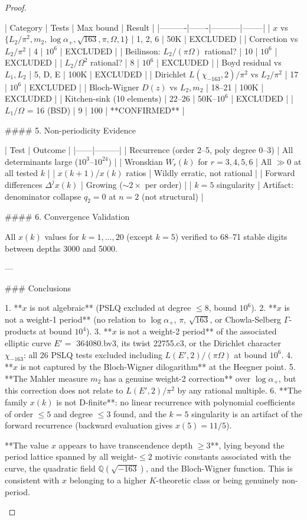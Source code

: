\begin{theorem}
\begin{lemma}
\begin{proposition}
\begin{corollary}
\begin{proof}
\begin{remark}
| Category | Tests | Max bound | Result |
|----------|-------|-----------|--------|
| $x$ vs $\{L_2/\pi^2, m_2, \log\alpha_+, \sqrt{163}, \pi, \Omega, 1\}$ | 1, 2, 6 | 50K | EXCLUDED |
| Correction vs $L_2/\pi^2$ | 4 | $10^6$ | EXCLUDED |
| Beilinson: $L_2/(\pi\Omega)$ rational? | 10 | $10^6$ | EXCLUDED |
| $L_2/\Omega^2$ rational? | 8 | $10^6$ | EXCLUDED |
| Boyd residual vs $L_1, L_2$ | 5, D, E | 100K | EXCLUDED |
| Dirichlet $L(\chi_{-163},2)/\pi^2$ vs $L_2/\pi^2$ | 17 | $10^6$ | EXCLUDED |
| Bloch-Wigner $D(z)$ vs $L_2, m_2$ | 18–21 | 100K | EXCLUDED |
| Kitchen-sink (10 elements) | 22–26 | 50K–$10^6$ | EXCLUDED |
| $L_1/\Omega$ = 16 (BSD) | 9 | 100 | **CONFIRMED** |

#### 5. Non-periodicity Evidence

| Test | Outcome |
|------|---------|
| Recurrence (order 2–5, poly degree 0–3) | All determinants large ($10^3$–$10^{24}$) |
| Wronskian $W_r(k)$ for $r=3,4,5,6$ | All $\gg 0$ at all tested $k$ |
| $x(k+1)/x(k)$ ratios | Wildly erratic, not rational |
| Forward differences $\Delta^j x(k)$ | Growing ($\sim 2\times$ per order) |
| $k=5$ singularity | Artifact: denominator collapse $q_2 = 0$ at $n=2$ (not structural) |

#### 6. Convergence Validation

All $x(k)$ values for $k=1,\ldots,20$ (except $k=5$) verified to 68–71 stable digits between depths 3000 and 5000.

---

### Conclusions

1. **$x$ is not algebraic** (PSLQ excluded at degree $\leq 8$, bound $10^6$).
2. **$x$ is not a weight-1 period** (no relation to $\log\alpha_+$, $\pi$, $\sqrt{163}$, or Chowla-Selberg $\Gamma$-products at bound $10^4$).
3. **$x$ is not a weight-2 period** of the associated elliptic curve $E' = $ 364080.bv3, its twist 22755.c3, or the Dirichlet character $\chi_{-163}$: all 26 PSLQ tests excluded including $L(E',2)/(\pi\Omega)$ at bound $10^6$.
4. **$x$ is not captured by the Bloch-Wigner dilogarithm** at the Heegner point.
5. **The Mahler measure $m_2$ has a genuine weight-2 correction** over $\log\alpha_+$, but this correction does not relate to $L(E',2)/\pi^2$ by any rational multiple.
6. **The family $x(k)$ is not D-finite**: no linear recurrence with polynomial coefficients of order $\leq 5$ and degree $\leq 3$ found, and the $k=5$ singularity is an artifact of the forward recurrence (backward evaluation gives $x(5) = 11/5$).

**The value $x$ appears to have transcendence depth $\geq 3$**, lying beyond the period lattice spanned by all weight-$\leq 2$ motivic constants associated with the curve, the quadratic field $\mathbb{Q}(\sqrt{-163})$, and the Bloch-Wigner function. This is consistent with $x$ belonging to a higher $K$-theoretic class or being genuinely non-period.   





\end{remark}
\end{proof}
\end{corollary}
\end{proposition}
\end{lemma}
\end{theorem}
